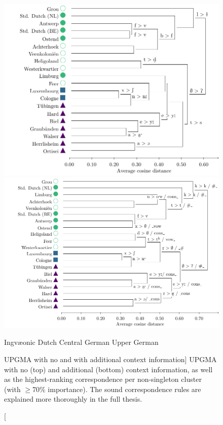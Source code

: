 \documentclass[a4paper, 11pt]{article}
\def\upper{\color{purple}\FilledBigTriangleUp}
\def\central{\color{midblue}\FilledBigSquare}
\def\dutch{\color{green}\FilledBigCircle}
\def\ingv{\color{green}\BigCircle}
\begin{document}
\begin{figure}[h]
\begin{adjustwidth}{-1cm}{-1cm}
\includegraphics[height=0.45\textheight]{figures/tfidf-nocontext.pdf}\\
\includegraphics[height=0.45\textheight]{figures/tfidf-context.pdf}
\end{adjustwidth}
\vspace{0.3em}
\begin{center}
{\ingv} Ingv\ae{}onic \hspace{1em}
{\dutch} Dutch \hspace{1em}
{\central} Central German \hspace{1em}
{\upper} Upper German
\end{center}
\caption
[UPGMA with no and with additional context information]
{UPGMA with no (top) and additional (bottom) context information,
as well as the highest-ranking correspondence per non-singleton cluster
(with $\geq$70\% importance).
The sound correspondence rules are explained more thoroughly in the full thesis.
}
\label{fig:tfidf-dendrograms}
\end{figure}
\end{document}
